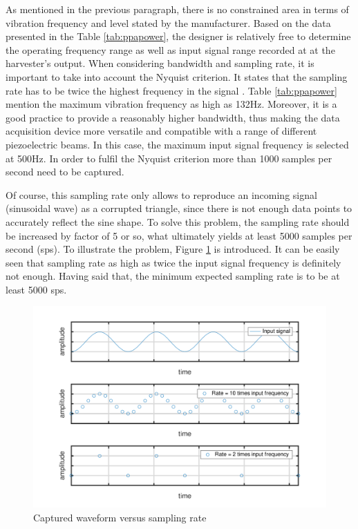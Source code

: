 \documentclass[12pt,a4paper]{article}
\begin{document}
As mentioned in the previous paragraph, there is no constrained area in terms of vibration frequency and level stated by the manufacturer. Based on the data presented in the Table \ref{tab:ppapower}, the designer is relatively free to determine the operating frequency range as well as input signal range recorded at at the harvester's output. When considering bandwidth and sampling rate, it is important to take into account the Nyquist criterion. It states that the sampling rate has to be twice the highest frequency in the signal \cite{ElEx}. Table \ref{tab:ppapower} mention the maximum vibration frequency as high as 132Hz. Moreover, it is a good practice to provide a reasonably higher bandwidth, thus making the data acquisition device more versatile and compatible with a range of different piezoelectric beams. In this case, the maximum input signal frequency is selected at 500Hz. In order to fulfil the Nyquist criterion more than 1000 samples per second need to be captured.
\par

Of course, this sampling rate only allows to reproduce an incoming signal (sinusoidal wave) as a corrupted triangle, since there is not enough data points to accurately reflect the sine shape. To solve this problem, the sampling rate should be increased by factor of 5 or so, what ultimately yields at least 5000 samples per second (sps). To illustrate the problem, Figure \ref{fig:nyquist} is introduced. It can be easily seen that sampling rate as high as twice the input signal frequency is definitely not enough. Having said that, the minimum expected sampling rate is to be at least 5000 sps.
\par

\begin{figure}[h!]
\includegraphics[scale=0.75]{nyquist.pdf}
\caption{Captured waveform versus sampling rate}
\label{fig:nyquist}
\end{figure}
\end{document}
